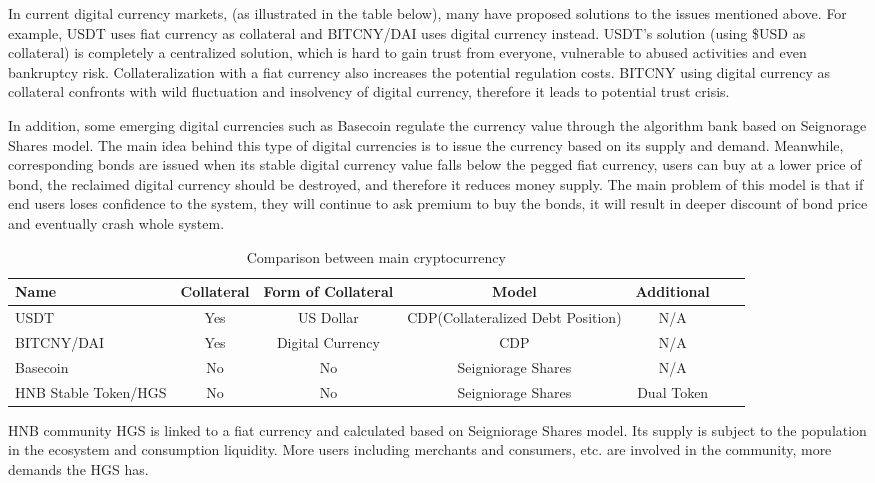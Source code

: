 \documentclass[fleqn,10pt]{SelfArx} %
\begin{document}
In current digital currency markets, (as illustrated in the table below), many have proposed solutions to the issues mentioned above. For example, USDT uses fiat currency as collateral and BITCNY/DAI uses digital currency instead. USDT’s solution (using \$USD as collateral) is completely a centralized solution, which is hard to gain trust from everyone, vulnerable to abused activities and even bankruptcy risk.  Collateralization with a fiat currency also increases the potential regulation costs.  BITCNY using digital currency as collateral confronts with wild fluctuation and insolvency of digital currency, therefore it leads to potential trust crisis.

In addition, some emerging digital currencies such as Basecoin regulate the currency value through the algorithm bank based on Seignorage Shares model. The main idea behind this type of digital currencies is to issue the currency based on its supply and demand. Meanwhile, corresponding bonds are issued when its stable digital currency value falls below the pegged fiat currency, users can buy at a lower price of bond, the reclaimed digital currency should be destroyed, and therefore it reduces money supply. The main problem of this model is that if end users loses confidence to the system, they will continue to ask premium to buy the bonds, it will result in deeper discount of bond price and eventually crash whole system. 

\begin{table}[!ht]
\caption{Comparison between main cryptocurrency}
\centering
\begin{tabular}{lcccccr}
\toprule
Name & Collateral & Form of Collateral & Model & Additional\\
\midrule
USDT & Yes & US Dollar & CDP(Collateralized Debt Position) & N/A \\
BITCNY/DAI & Yes & Digital Currency & CDP & N/A \\
Basecoin & No & No & Seigniorage Shares & N/A \\
HNB Stable Token/HGS & No & No & Seigniorage Shares & Dual Token \\
\bottomrule
\end{tabular}
\label{tab:label}
\end{table}

HNB community HGS is linked to a fiat currency and calculated based on Seigniorage Shares model. Its supply is subject to the population in the ecosystem and consumption liquidity.  More users including merchants and consumers, etc. are involved in the community, more demands the HGS has. 
\end{document}
